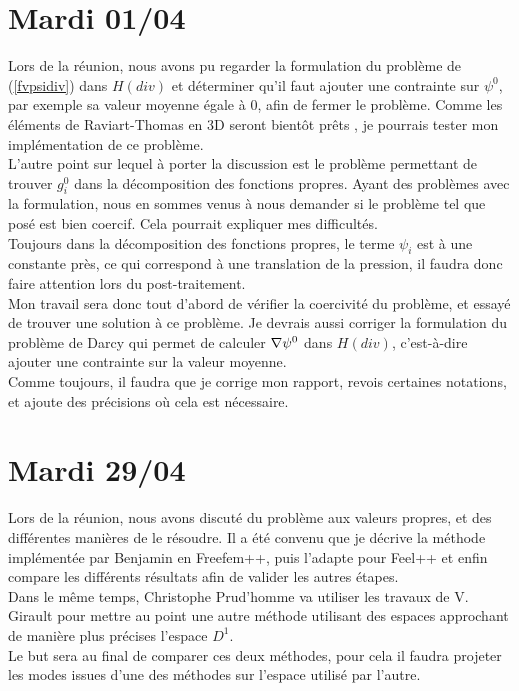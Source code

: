 \section{Mardi 01/04}

Lors de la réunion, nous avons pu regarder la formulation du problème de (\ref{fvpsidiv}) dans $H(div)$ et déterminer qu’il faut ajouter une contrainte sur $\psi^0$, par exemple sa valeur moyenne égale à 0, afin de fermer le problème. Comme les éléments de Raviart-Thomas en 3D seront bientôt prêts , je pourrais tester mon implémentation de ce problème.\\
L’autre point sur lequel à porter la discussion est le problème permettant de trouver $g_i^0$ dans la décomposition des fonctions propres. Ayant des problèmes avec la formulation, nous en sommes venus à nous demander si le problème tel que posé est bien coercif. Cela pourrait expliquer mes difficultés.\\
Toujours dans la décomposition des fonctions propres, le terme $\psi_i$ est à une constante près, ce qui correspond à une translation de la pression, il faudra donc faire attention lors du post-traitement.\\

Mon travail sera donc tout d’abord de vérifier la coercivité du problème, et essayé de trouver une solution à ce problème. Je devrais aussi corriger la formulation du problème de Darcy qui permet de calculer ${\nabla}\psi^0$ dans $H(div)$, c’est-à-dire ajouter une contrainte sur la valeur moyenne.\\
Comme toujours, il faudra que je corrige mon rapport, revois certaines notations, et ajoute des précisions où cela est nécessaire.

\section{Mardi 29/04}

Lors de la réunion, nous avons discuté du problème aux valeurs propres, et des différentes manières de le résoudre. Il a été convenu que je décrive la méthode implémentée par Benjamin en Freefem++, puis l'adapte pour Feel++ et enfin compare les différents résultats afin de valider les autres étapes.\\
Dans le même temps, Christophe Prud'homme va utiliser les travaux de V. Girault \cite{girault90-1} pour mettre au point une autre méthode utilisant des espaces approchant de manière plus précises l'espace $D^1$.\\
Le but sera au final de comparer ces deux méthodes, pour cela il faudra projeter les modes issues d'une des méthodes sur l'espace utilisé par l'autre.\\

